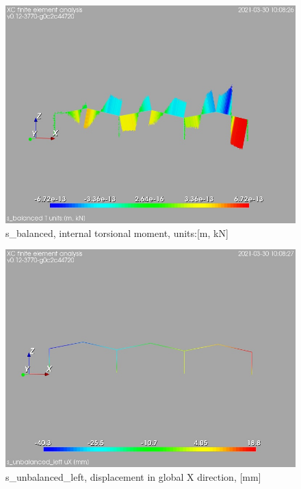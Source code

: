 \begin{figure}
\begin{center}
\includegraphics[width=\linewidth]{calc_results/sole_zeinali/text/graphics/resSimplLC/s_balancedallMemberSetT}
\caption{s_balanced, internal torsional moment, units:[m, kN]}
\end{center}
\end{figure}
\cleardoublepage
\begin{figure}
\begin{center}
\includegraphics[width=\linewidth]{calc_results/sole_zeinali/text/graphics/resSimplLC/s_unbalanced_lefttotaluX}
\caption{s_unbalanced_left, displacement in global X direction, [mm]}
\end{center}
\end{figure}
